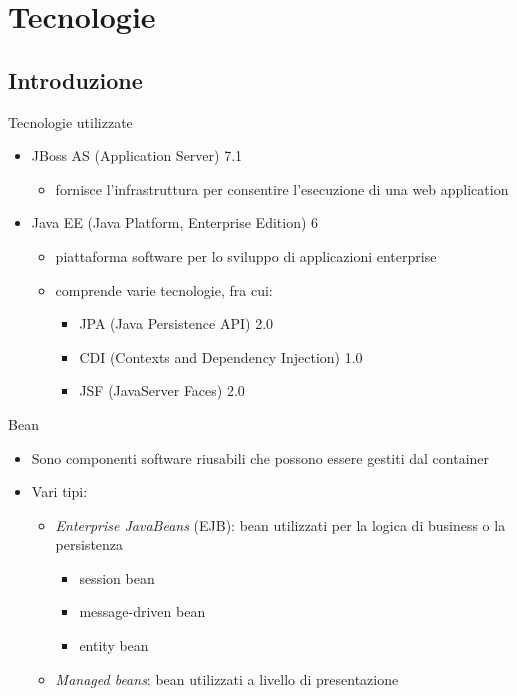 \section{Tecnologie}

\subsection{Introduzione}

\begin{frame}{Tecnologie utilizzate}

\begin{itemize}
\item JBoss AS (Application Server) 7.1
	\begin{itemize}
	\item fornisce l'infrastruttura per consentire l'esecuzione di una web application
	\end{itemize}

\item Java EE (Java Platform, Enterprise Edition) 6
	\begin{itemize}
	\item piattaforma software per lo sviluppo di applicazioni enterprise
	\item comprende varie tecnologie, fra cui:
		\begin{itemize}
		\item JPA (Java Persistence API) 2.0
		\item CDI (Contexts and Dependency Injection) 1.0
		\item JSF (JavaServer Faces) 2.0
		\end{itemize}
		
	\end{itemize}

\end{itemize}


\end{frame}

\begin{frame}{Bean}

\begin{itemize}
\item Sono componenti software riusabili che possono essere gestiti dal container

\item Vari tipi:
	\begin{itemize}
	
	\item \textsl{Enterprise JavaBeans} (EJB): bean utilizzati per la logica di business o la persistenza
		\begin{itemize}
		\item session bean
		\item message-driven bean
		\item entity bean
		\end{itemize}
		
	\item  \textsl{Managed beans}: bean utilizzati a livello di presentazione
	\end{itemize}

\end{itemize}

\end{frame}


